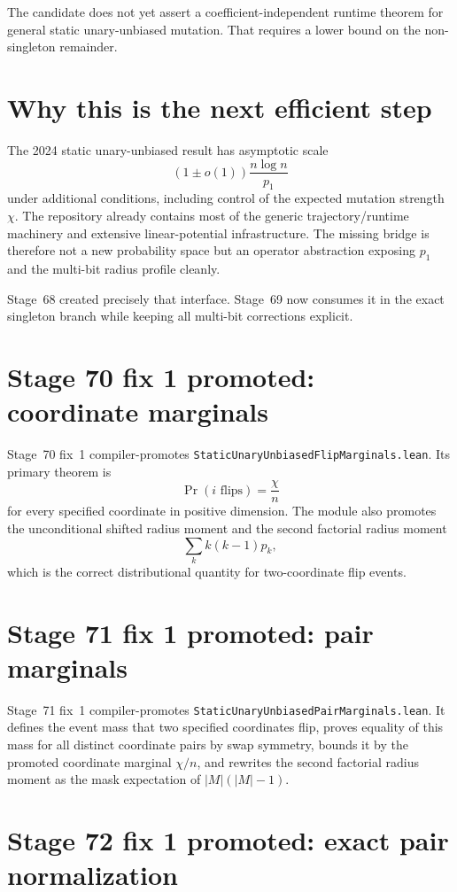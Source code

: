 \documentclass[11pt]{article}
\begin{document}
The candidate does not yet assert a coefficient-independent runtime theorem for general
static unary-unbiased mutation. That requires a lower bound on the non-singleton
remainder.

\section{Why this is the next efficient step}

The 2024 static unary-unbiased result has asymptotic scale
\[
  (1\pm o(1))\frac{n\log n}{p_1}
\]
under additional conditions, including control of the expected mutation strength
$\chi$. The repository already contains most of the generic trajectory/runtime machinery
and extensive linear-potential infrastructure. The missing bridge is therefore not a new
probability space but an operator abstraction exposing $p_1$ and the multi-bit radius
profile cleanly.

Stage~68 created precisely that interface. Stage~69 now consumes it in the exact singleton branch while keeping all multi-bit corrections explicit.

\section{Stage 70 fix 1 promoted: coordinate marginals}

Stage~70 fix~1 compiler-promotes \texttt{StaticUnaryUnbiasedFlipMarginals.lean}. Its primary theorem is
\[
  \Pr(i\text{ flips})=\frac{\chi}{n}
\]
for every specified coordinate in positive dimension. The module also promotes the unconditional shifted radius moment and the second factorial radius moment
\[
  \sum_k k(k-1)p_k,
\]
which is the correct distributional quantity for two-coordinate flip events.

\section{Stage 71 fix 1 promoted: pair marginals}

Stage~71 fix~1 compiler-promotes \texttt{StaticUnaryUnbiasedPairMarginals.lean}. It defines the event mass that two specified coordinates flip, proves equality of this mass for all distinct coordinate pairs by swap symmetry, bounds it by the promoted coordinate marginal $\chi/n$, and rewrites the second factorial radius moment as the mask expectation of $|M|(|M|-1)$.

\section{Stage 72 fix 1 promoted: exact pair normalization}
\end{document}
